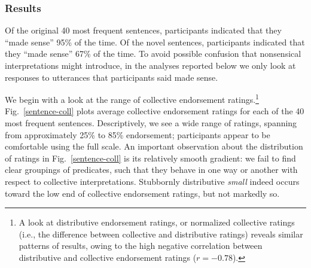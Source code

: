 \documentclass[preprint,12pt,authoryear,titlepage]{elsarticle}
\newcommand{\ndg}[1]{\textcolor{Green}{[ndg: #1]}}
\begin{document}
%

\subsubsection{Results}

Of the original 40 most frequent sentences, participants indicated that they ``made sense'' 95\% of the time. Of the novel sentences, participants indicated that they ``made sense'' 67\% of the time.
To avoid possible confusion that nonsensical interpretations might introduce, in the analyses reported below we only look at responses to utterances that participants said made sense. %

We begin with a look at the range of collective endorsement ratings.\footnote{A look at distributive endorsement ratings, or normalized collective ratings (i.e., the difference between collective and distributive ratings) reveals similar patterns of results, owing to the high negative correlation between distributive and collective endorsement ratings ($r=-0.78$).} Fig.~\ref{sentence-coll} plots average collective endorsement ratings for each of the 40 most frequent sentences. Descriptively, we see a wide range of ratings, spanning from approximately 25\%  to 85\% endorsement; participants appear to be comfortable using the full scale. An important observation about the distribution of ratings in Fig.~\ref{sentence-coll} is its relatively smooth gradient: we fail to find clear groupings of predicates, such that they behave in one way or another with respect to collective interpretations. Stubbornly distributive \emph{small} indeed occurs toward the low end of collective endorsement ratings, but not markedly so.
\end{document}

